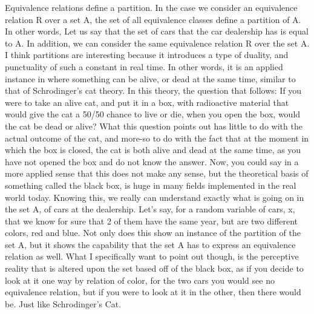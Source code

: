 \begin{enumerate}[label=(\alph*)]
  Equivalence relations define a partition. In the case we consider an equivalence relation R over a set A, the set of all equivalence classes define a partition of A. In other words, Let us say that the set of cars that the car dealership has is equal to A. In addition, we can consider the same equivalence relation R over the set A. I think partitions are interesting because it introduces a type of duality, and punctuality of such a constant in real time. In other words, it is an applied instance in where something can be alive, or dead at the same time, similar to that of Schrodinger's cat theory. In this theory, the question that follows: If you were to take an alive cat, and put it in a box, with radioactive material that would give the cat a 50/50 chance to live or die, when you open the box, would the cat be dead or alive? What this question points out has little to do with the actual outcome of the cat, and more-so to do with the fact that at the moment in which the box is closed, the cat is both alive and dead at the same time, as you have not opened the box and do not know the answer. Now, you could say in a more applied sense that this does not make any sense, but the theoretical basis of something called the black box, is huge in many fields implemented in the real world today. Knowing this, we really can understand exactly what is going on in the set A, of cars at the dealership. Let's say, for a random variable of cars, x, that we know for sure that 2 of them have the same year, but are two different colors, red and blue. Not only does this show an instance of the partition of the set A, but it shows the capability that the set A has to express an equivalence relation as well. What I specifically want to point out though, is the perceptive reality that is altered upon the set based off of the black box, as if you decide to look at it one way by relation of color, for the two cars you would see no equivalence relation, but if you were to look at it in the other, then there would be. Just like Schrodinger's Cat.
\\\\
  \end{enumerate}
\newpage

